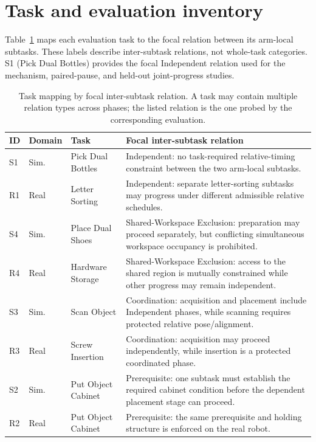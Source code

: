 \section{Task and evaluation inventory}
\label{app:tasks}
Table~\ref{tab:tasks} maps each evaluation task to the focal relation between its arm-local subtasks. These labels describe inter-subtask relations, not whole-task categories. S1 (Pick Dual Bottles) provides the focal Independent relation used for the mechanism, paired-pause, and held-out joint-progress studies.

\begin{table}[ht]
\caption{Task mapping by focal inter-subtask relation. A task may contain multiple relation types across phases; the listed relation is the one probed by the corresponding evaluation.}
\label{tab:tasks}
\centering\small
\begin{tabularx}{\linewidth}{llXX}
\toprule
ID & Domain & Task & Focal inter-subtask relation \\
\midrule
S1 & Sim. & Pick Dual Bottles & Independent: no task-required relative-timing constraint between the two arm-local subtasks.\\
R1 & Real & Letter Sorting & Independent: separate letter-sorting subtasks may progress under different admissible relative schedules.\\
S4 & Sim. & Place Dual Shoes & Shared-Workspace Exclusion: preparation may proceed separately, but conflicting simultaneous workspace occupancy is prohibited.\\
R4 & Real & Hardware Storage & Shared-Workspace Exclusion: access to the shared region is mutually constrained while other progress may remain independent.\\
S3 & Sim. & Scan Object & Coordination: acquisition and placement include Independent phases, while scanning requires protected relative pose/alignment.\\
R3 & Real & Screw Insertion & Coordination: acquisition may proceed independently, while insertion is a protected coordinated phase.\\
S2 & Sim. & Put Object Cabinet & Prerequisite: one subtask must establish the required cabinet condition before the dependent placement stage can proceed.\\
R2 & Real & Put Object Cabinet & Prerequisite: the same prerequisite and holding structure is enforced on the real robot.\\
\bottomrule
\end{tabularx}
\end{table}

